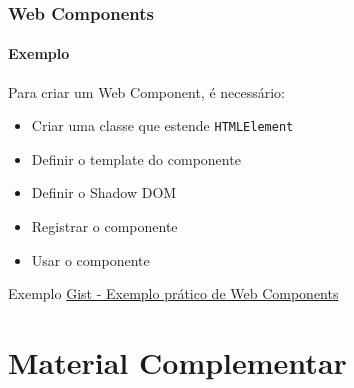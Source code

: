 \documentclass[
	9pt, %
	t, %
]{beamer}
\newcommand{\iconLink}[2]{\href{#1}{\faLink \hspace{0.2em} {#2}}}
\begin{document}
\begin{frame}
	\frametitle{Web Components}
	\framesubtitle{Exemplo}

	Para criar um Web Component, é necessário:
	\begin{itemize}
		\item Criar uma classe que estende \texttt{HTMLElement}
		\item Definir o template do componente
		\item Definir o Shadow DOM
		\item Registrar o componente
		\item Usar o componente
	\end{itemize}
	
	\begin{exampleblock}{Exemplo}
		\centering
		\iconLink{https://gist.github.com/fabricioifc/36e978f4ff2add25ca0eed6e86219918}{Gist - Exemplo prático de Web Components}
	\end{exampleblock}	

\end{frame}

\section{Material Complementar}
\end{document}
